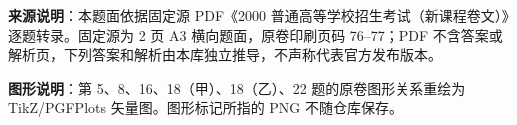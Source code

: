 


\begin{gktip}
\textbf{来源说明}：本题面依据固定源 PDF《2000 普通高等学校招生考试（新课程卷文）》逐题转录。固定源为 2 页 A3 横向题面，原卷印刷页码 76–77；PDF 不含答案或解析页，下列答案和解析由本库独立推导，不声称代表官方发布版本。

\textbf{图形说明}：第 5、8、16、18（甲）、18（乙）、22 题的原卷图形关系重绘为 TikZ/PGFPlots 矢量图。图形标记所指的 PNG 不随仓库保存。
\end{gktip}


